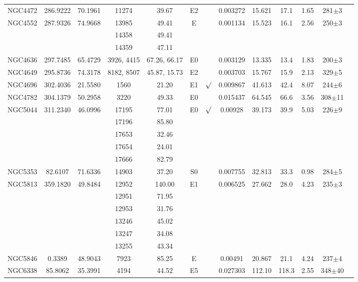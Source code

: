 \documentclass[apjl]{emulateapj}
\begin{document}
\begin{table}
\begin{tabular}{lcccccccccccc}
NGC4472 & 286.9222 & 70.1961 & 11274 & 39.67    & E2   &         & 0.003272 & 15.621 & 17.1  &  1.65 & 281$\pm$3\\
NGC4552 & 287.9326 & 74.9668  & 13985 & 49.41 & E  &           & 0.001134 & 15.523 & 16.1 & 2.56 & 250$\pm$3 \\
        & && 14358 & 49.41 & \\
        & && 14359 & 47.11 & \\
NGC4636 & 297.7485 & 65.4729 & 3926, 4415  & 67.26, 66.17    & E0   &         & 0.003129 & 13.335 & 13.4  &  1.83 & 200$\pm$3  \\
NGC4649 & 295.8736 & 74.3178 & 8182, 8507  & 45.87, 15.73    & E2   &         & 0.003703 & 15.767 & 15.9  &  2.13 & 329$\pm$5 \\
NGC4696 & 302.4036 & 21.5580 & 1560  & 21.20 & E1 & $\surd$ & 0.009867 & 41.613 & 42.4 & 8.07 & 244$\pm$6 \\
NGC4782 & 304.1379 & 50.2958 & 3220 & 49.33 & E0 &          & 0.015437 & 64.545 & 66.6 & 3.56 & 308$\pm$11 \\
NGC5044 & 311.2340 & 46.0996 & 17195 & 77.01    & E0   & $\surd$ & 0.00928  & 39.173 & 39.9  &  5.03 & 226$\pm$9  \\
        &          &          & 17196 & 85.80    &      &         \\
        &          &          & 17653 & 32.46    &      &         \\
        &          &          & 17654 & 24.01    & \\
        &          &          & 17666 & 82.79    & \\
NGC5353 & 82.6107 & 71.6336 & 14903 & 37.20 & S0 &            & 0.007755 & 32.813 & 33.3 & 0.98 & 284$\pm$5 \\
NGC5813 & 359.1820 & 49.8484 & 12952 & 140.00 & E1 &        & 0.006525 & 27.662 & 28.0 & 4.23 & 235$\pm$3 \\
        &          &          & 12951 & 71.95    &  \\
        &          &          & 12953 & 31.76    & \\
        &          &          & 13246 & 45.02    & \\
        &          &          & 13247 & 34.08    & \\
        &          &          & 13255 & 43.34    & \\
NGC5846 & 0.3389   & 48.9043 &  7923 & 85.25    & E    &         & 0.00491  & 20.867 & 21.1  &  4.24 & 237$\pm$4 \\
NGC6338 & 85.8062 & 35.3991 & 4194 & 44.52 & E5 &           & 0.027303 & 112.10 & 118.3 & 2.55 & 348$\pm$40 \\

\end{tabular}
\end{table}
\end{document}
